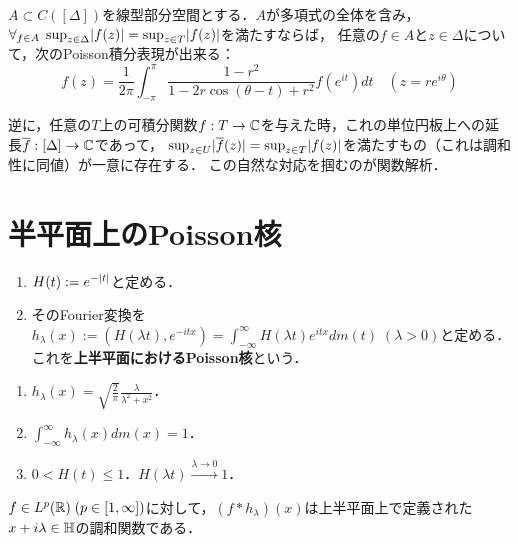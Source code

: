 \documentclass[uplatex,dvipdfmx]{jsreport}
\begin{document}
\begin{theorem}[Poisson積分]
    $A\subset C([\Delta])$を線型部分空間とする．$A$が多項式の全体を含み，$\forall_{f\in A}\;\sup_{z\in\Delta}\lvert f(z)\rvert=\sup_{z\in T}\lvert f(z)\rvert$を満たすならば，
    任意の$f\in A$と$z\in\Delta$について，次のPoisson積分表現が出来る：
    \[f(z)=\frac{1}{2\pi}\int^\pi_{-\pi}\frac{1-r^2}{1-2r\cos(\theta-t)+r^2}f(e^{it})dt\quad(z=re^{i\theta})\]
\end{theorem}
\begin{remarks}
    逆に，任意の$T$上の可積分関数$f:T\to\mathbb{C}$を与えた時，これの単位円板上への延長$\overline{f}:[\Delta]\to\mathbb{C}$であって，
    $\sup_{z\in U}\lvert\overline{f}(z)\rvert=\sup_{z\in T}\lvert f(z)\rvert$を満たすもの（これは調和性に同値）が一意に存在する．
    この自然な対応を掴むのが関数解析．
\end{remarks}

\section{半平面上のPoisson核}

\begin{definition}\mbox{}
    \begin{enumerate}
        \item $H(t):=e^{-\lvert t\rvert}$と定める．
        \item そのFourier変換を$h_\lambda(x):=(H(\lambda t),e^{-itx})=\int^\infty_{-\infty}H(\lambda t)e^{itx}dm(t)\;(\lambda>0)$と定める．これを\textbf{上半平面におけるPoisson核}という．
    \end{enumerate}
\end{definition}

\begin{lemma}[上半平面のPoisson核の性質]\mbox{}
    \begin{enumerate}
        \item $h_\lambda(x)=\sqrt{\frac{2}{\pi}}\frac{\lambda}{\lambda^2+x^2}$．
        \item $\int^\infty_{-\infty}h_\lambda(x)dm(x)=1$．
        \item $0<H(t)\le 1$．$H(\lambda t)\xrightarrow{\lambda\to0}1$．
    \end{enumerate}
\end{lemma}

\begin{theorem}
    $f\in L^p(\mathbb{R})\;(p\in[1,\infty])$に対して，$(f*h_\lambda)(x)$は上半平面上で定義された$x+i\lambda\in\mathbb{H}$の調和関数である．
\end{theorem}
\end{document}
